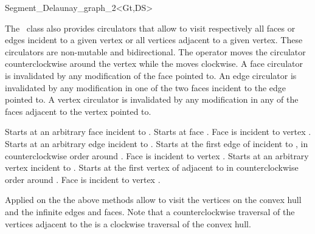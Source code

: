 \begin{ccRefClass}{Segment_Delaunay_graph_2<Gt,DS>}

The \ccRefName\ class also provides circulators that allow to visit
respectively all faces or edges incident to a given vertex or all
vertices adjacent to a given vertex. These circulators are non-mutable
and bidirectional. The operator  moves the circulator
counterclockwise around the vertex while the  moves
clockwise. A face circulator is invalidated by any modification of the
face pointed to. An edge circulator is invalidated by any modification
in one of the two faces incident to the edge pointed to. A vertex
circulator is invalidated by any modification in any of the faces
adjacent to the vertex pointed to.

{Starts at an arbitrary face incident
to .}
\ccGlue
{}
{Starts at face .
\ccPrecond Face  is incident to vertex .}
\ccGlue
{}
{Starts at an arbitrary edge incident
to .}
\ccGlue
{}
{Starts at the first edge of  incident to 
, in counterclockwise order around .
\ccPrecond Face  is incident to vertex .}
\ccGlue
{}
{Starts at an arbitrary  vertex incident
to .}
\ccGlue
{}
{Starts at the first vertex of  adjacent  to 
in  counterclockwise order around .
\ccPrecond Face  is incident to vertex .}




Applied on the 
the above methods  allow to visit the vertices on the convex hull and
the infinite edges and faces. Note that a counterclockwise
traversal of the vertices adjacent to the  is
a clockwise traversal of the convex hull.

\ccGlue
{}
\ccGlue
{}
\ccGlue
{}
\ccGlue
{}
\ccGlue
{}





\end{ccRefClass}

